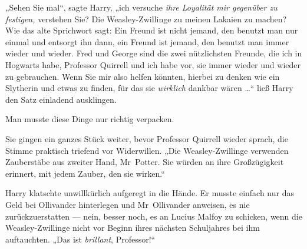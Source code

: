 „Sehen Sie mal“, sagte Harry, „ich versuche \emph{ihre Loyalität mir gegenüber zu festigen,} verstehen Sie? Die Weasley-Zwillinge zu meinen Lakaien zu machen? Wie das alte Sprichwort sagt: Ein Freund ist nicht jemand, den benutzt man nur einmal und entsorgt ihn dann, ein Freund ist jemand, den benutzt man immer wieder und wieder. Fred und George sind die zwei nützlichsten Freunde, die ich in Hogwarts habe, Professor Quirrell und ich habe vor, sie immer wieder und wieder zu gebrauchen. Wenn Sie mir also helfen könnten, hierbei zu denken wie ein Slytherin und etwas zu finden, für das sie \emph{wirklich} dankbar wären …“ ließ Harry den Satz einladend ausklingen.

Man musste diese Dinge nur richtig verpacken.

Sie gingen ein ganzes Stück weiter, bevor Professor Quirrell wieder sprach, die Stimme praktisch triefend vor Widerwillen.
„Die Weasley-Zwillinge verwenden Zauberstäbe aus zweiter Hand, Mr~Potter. Sie würden an ihre Großzügigkeit erinnert, mit jedem Zauber, den sie wirken.“

Harry klatschte unwillkürlich aufgeregt in die Hände. Er musste einfach nur das Geld bei Ollivander hinterlegen und Mr~Ollivander anweisen, es nie zurückzuerstatten — nein, besser noch, es an Lucius Malfoy zu schicken, wenn die Weasley-Zwillinge nicht vor Beginn ihres nächsten Schuljahres bei ihm auftauchten.
„Das ist \emph{brillant}, Professor!“

